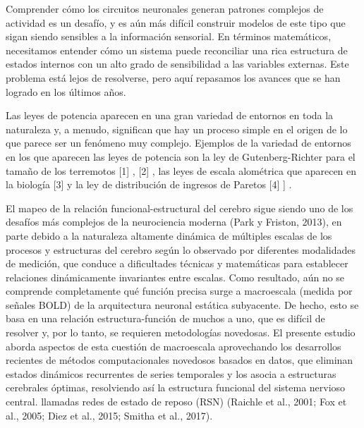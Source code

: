  Comprender cómo los circuitos neuronales generan patrones complejos de actividad es un desafío,  y es aún más difícil construir modelos de este tipo que sigan siendo sensibles a la información sensorial. En términos matemáticos, necesitamos entender cómo un sistema puede reconciliar una rica estructura de estados internos con un alto grado de sensibilidad a las variables externas. Este problema está lejos de resolverse, pero aquí repasamos los avances que se han logrado en los últimos años.


Las leyes de potencia aparecen en una gran variedad de entornos en toda la naturaleza y, a menudo, significan que hay un proceso simple en el origen de lo que parece ser un fenómeno muy complejo. Ejemplos de la variedad de entornos en los que aparecen las leyes de potencia son la ley de Gutenberg-Richter para el tamaño de los terremotos [1] , [2] , las leyes de escala alométrica que aparecen en la biología [3] y la ley de distribución de ingresos de Paretos [4] ] .


El mapeo de la relación funcional-estructural del cerebro sigue siendo uno de los desafíos más complejos de la neurociencia moderna (Park y Friston, 2013), en parte debido a la naturaleza altamente dinámica de múltiples escalas de los procesos y estructuras del cerebro según lo observado por diferentes modalidades de medición, que conduce a dificultades técnicas y matemáticas para establecer relaciones dinámicamente invariantes entre escalas. Como resultado, aún no se comprende completamente qué función precisa surge a macroescala (medida por señales BOLD) de la arquitectura neuronal estática subyacente. De hecho, esto se basa en una relación estructura-función de muchos a uno, que es difícil de resolver y, por lo tanto, se requieren metodologías novedosas. El presente estudio aborda aspectos de esta cuestión de macroescala aprovechando los desarrollos recientes de métodos computacionales novedosos basados en datos, que eliminan estados dinámicos recurrentes de series temporales y los asocia a estructuras cerebrales óptimas, resolviendo así la estructura funcional del sistema nervioso central. llamadas redes de estado de reposo (RSN) (Raichle et al., 2001; Fox et al., 2005; Diez et al., 2015; Smitha et al.,
2017).


